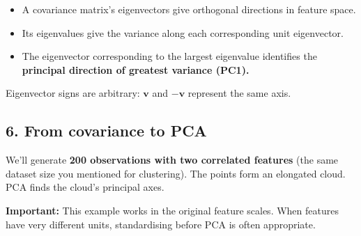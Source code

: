 \documentclass[11pt]{article}
\providecommand{\tightlist}{%
      \setlength{\itemsep}{0pt}\setlength{\parskip}{0pt}}
\begin{document}
\begin{itemize}
\tightlist
\item
  A covariance matrix's eigenvectors give orthogonal directions in
  feature space.
\item
  Its eigenvalues give the variance along each corresponding unit
  eigenvector.
\item
  The eigenvector corresponding to the largest eigenvalue identifies the
  \textbf{principal direction of greatest variance (PC1).}
\end{itemize}

Eigenvector signs are arbitrary: \(\mathbf v\) and \(-\mathbf v\)
represent the same axis.



    \subsection{6. From covariance to PCA}\label{section-6}

We'll generate \textbf{200 observations with two correlated features}
(the same dataset size you mentioned for clustering). The points form an
elongated cloud. PCA finds the cloud's principal axes.

\textbf{Important:} This example works in the original feature scales.
When features have very different units, standardising before PCA is
often appropriate.
\end{document}
